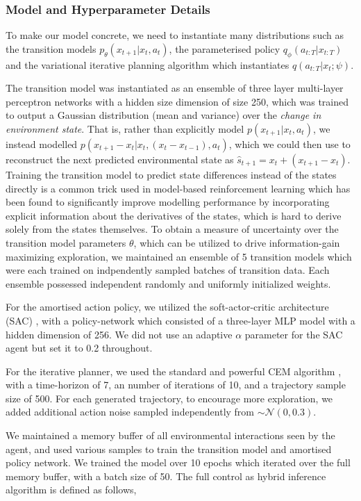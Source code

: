 \subsubsection{Model and Hyperparameter Details}

To make our model concrete, we need to instantiate many distributions such as the transition models $p_\theta(x_{t+1} | x_t, a_t)$, the parameterised policy $q_\phi(a_{t:T} | x_{t:T})$ and the variational iterative planning algorithm which instantiates $q(a_{t:T} | x_t; \psi)$.

The transition model was instantiated as an ensemble of three layer multi-layer perceptron networks with a hidden size dimension of size 250, which was trained to output a Gaussian distribution (mean and variance) over the \emph{change in environment state}. That is, rather than explicitly model $p(x_{t+1} |x_t, a_t)$, we instead modelled $p(x_{t+1} - x_t | x_t, (x_t - x_{t-1}), a_t)$, which we could then use to reconstruct the next predicted environmental state as $\hat{s}_{t+1} = x_t + (x_{t+1} - x_t)$. Training the transition model to predict state differences instead of the states directly is a common trick used in model-based reinforcement learning which has been found to significantly improve modelling performance by incorporating explicit information about the derivatives of the states, which is hard to derive solely from the states themselves. To obtain a measure of uncertainty over the transition model parameters $\theta$, which can be utilized to drive information-gain maximizing exploration, we maintained an ensemble of 5 transition models which were each trained on indpendently sampled batches of transition data. Each ensemble possessed independent randomly and uniformly initialized weights.

For the amortised action policy, we utilized the soft-actor-critic architecture (SAC) \citep{haarnoja2018soft}, with a policy-network which consisted of a three-layer MLP model with a hidden dimension of 256. We did not use an adaptive $\alpha$ parameter for the SAC agent but set it to 0.2 throughout.

For the iterative planner, we used the standard and powerful CEM algorithm \citep{de2005tutorial}, with a time-horizon of 7, an number of iterations of 10, and a trajectory sample size of 500. For each generated trajectory, to encourage more exploration, we added additional action noise sampled independently from $\sim \mathcal{N}(0, 0.3)$.

We maintained a memory buffer of all environmental interactions seen by the agent, and used various samples to train the transition model and amortised policy network. We trained the model over 10 epochs which iterated over the full memory buffer, with a batch size of 50. The full control as hybrid inference algorithm is defined as follows,
\newline 

